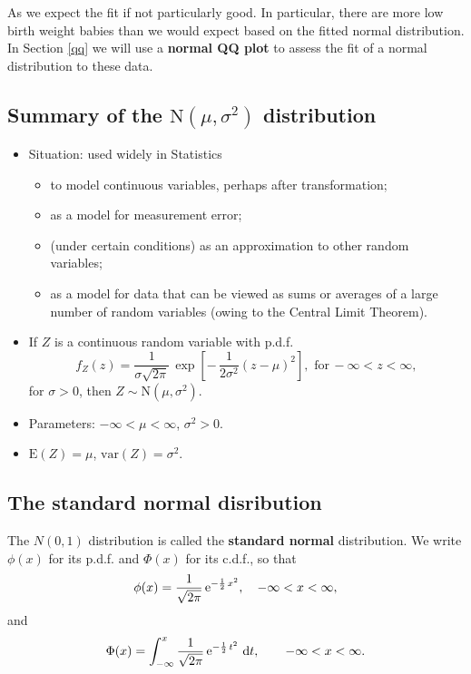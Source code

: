 \documentclass[
  british,
  11pt,
  openany, a4paper]{book}
\providecommand{\tightlist}{%
  \setlength{\itemsep}{0pt}\setlength{\parskip}{0pt}}
\begin{document}
As we expect the fit if not particularly good. In particular, there are more low birth weight babies than we would expect based on the fitted normal distribution. In Section \ref{qq} we will use a \textbf{normal QQ plot} to assess the fit of a normal distribution to these data.

\subsection{\texorpdfstring{Summary of the \(\text{N}(\mu,\sigma^2)\) distribution}{Summary of the \textbackslash text\{N\}(\textbackslash mu,\textbackslash sigma\^{}2) distribution}}\label{summary-of-the-textnmusigma2-distribution}

\begin{itemize}
\tightlist
\item
  Situation: used widely in Statistics

  \begin{itemize}
  \tightlist
  \item
    to model continuous variables, perhaps after transformation;
  \item
    as a model for measurement error;
  \item
    (under certain conditions) as an approximation to other random variables;
  \item
    as a model for data that can be viewed as sums or averages of a large number of random variables (owing to the Central Limit Theorem).
  \end{itemize}
\item
  If \(Z\) is a continuous random variable with p.d.f.
  \[ f_Z(z) = \displaystyle\frac{1}{\sigma\sqrt{2\pi}} \,\exp\!\left[ -\,\frac{1}{2\sigma^2}
  (z-\mu)^2 \right],
  \,\, \text{for}\,-\infty < z < \infty, \]
  for \(\sigma >0\), then \(Z \sim \text{N}(\mu,\sigma^{2})\).
\item
  Parameters: \(-\infty < \mu < \infty\), \(\sigma^2 > 0\).
\item
  \(\text{E}(Z)=\mu\), \(\text{var}(Z)=\sigma^2\).
\end{itemize}

\subsection{The standard normal disribution}\label{the-standard-normal-disribution}

The \(N(0,1)\) distribution is called the \textbf{standard normal} distribution. We write \(\phi(x)\) for its p.d.f. and \(\Phi(x)\) for its c.d.f., so that
\[ \phi(x)=\frac{1}{\sqrt{2\pi}} \,{\rm e}^{-\frac{1}{2}\,x^{2}}, \quad -\infty < x < \infty, \]
and
\[ \Phi(x) =
\int_{-\infty}^{x} \displaystyle\frac{1}{\sqrt{2\pi}} \,{\rm e}^{-\frac{1}{2}\,t^{2}} {\rm ~d}t, \quad 
\quad -\infty < x < \infty. \]
\end{document}
